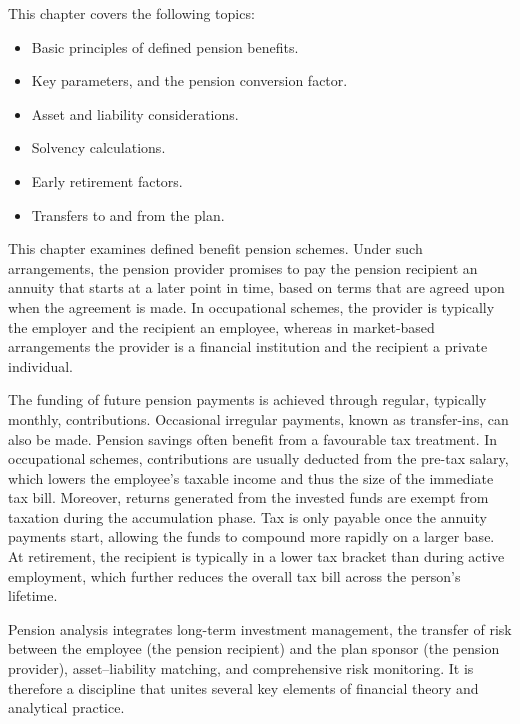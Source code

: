 \documentclass[
  letterpaper,
  DIV=11,
  numbers=noendperiod]{scrreprt}
\providecommand{\tightlist}{%
  \setlength{\itemsep}{0pt}\setlength{\parskip}{0pt}}
\begin{document}
\begin{tcolorbox}[enhanced jigsaw, arc=.35mm, bottomrule=.15mm, breakable, colback=white, colframe=quarto-callout-color-frame, left=2mm, leftrule=.75mm, opacityback=0, rightrule=.15mm, toprule=.15mm]

This chapter covers the following topics:

\begin{itemize}
\tightlist
\item
  Basic principles of defined pension benefits.
\item
  Key parameters, and the pension conversion factor.
\item
  Asset and liability considerations.
\item
  Solvency calculations.
\item
  Early retirement factors.
\item
  Transfers to and from the plan.
\end{itemize}

\end{tcolorbox}

This chapter examines defined benefit pension schemes. Under such
arrangements, the pension provider promises to pay the pension recipient
an annuity that starts at a later point in time, based on terms that are
agreed upon when the agreement is made. In occupational schemes, the
provider is typically the employer and the recipient an employee,
whereas in market-based arrangements the provider is a financial
institution and the recipient a private individual.

The funding of future pension payments is achieved through regular,
typically monthly, contributions. Occasional irregular payments, known
as transfer-ins, can also be made. Pension savings often benefit from a
favourable tax treatment. In occupational schemes, contributions are
usually deducted from the pre-tax salary, which lowers the employee's
taxable income and thus the size of the immediate tax bill. Moreover,
returns generated from the invested funds are exempt from taxation
during the accumulation phase. Tax is only payable once the annuity
payments start, allowing the funds to compound more rapidly on a larger
base. At retirement, the recipient is typically in a lower tax bracket
than during active employment, which further reduces the overall tax
bill across the person's lifetime.

Pension analysis integrates long-term investment management, the
transfer of risk between the employee (the pension recipient) and the
plan sponsor (the pension provider), asset--liability matching, and
comprehensive risk monitoring. It is therefore a discipline that unites
several key elements of financial theory and analytical practice.
\end{document}
